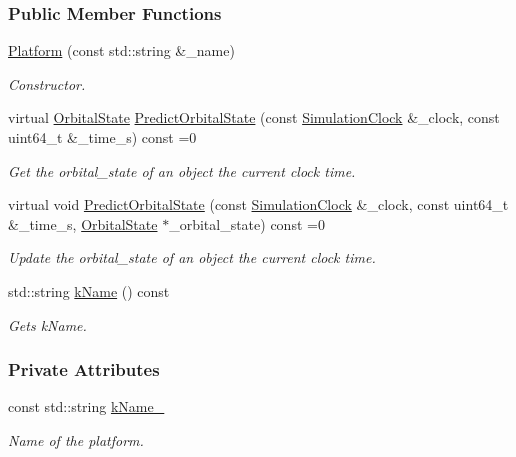 \subsubsection*{Public Member Functions}
\begin{DoxyCompactItemize}
\item 
\hyperlink{classosse_1_1collaborate_1_1_platform_aca95bfbb4f84285f1767d575a3e4c2ec}{Platform} (const std\+::string \&\+\_\+name)
\begin{DoxyCompactList}\small\item\em Constructor. \end{DoxyCompactList}\item 
virtual \hyperlink{classosse_1_1collaborate_1_1_orbital_state}{Orbital\+State} \hyperlink{classosse_1_1collaborate_1_1_platform_ad7070fcb9d91b22f25dbe0211ba0cc73}{Predict\+Orbital\+State} (const \hyperlink{classosse_1_1collaborate_1_1_simulation_clock}{Simulation\+Clock} \&\+\_\+clock, const uint64\+\_\+t \&\+\_\+time\+\_\+s) const =0
\begin{DoxyCompactList}\small\item\em Get the orbital\+\_\+state of an object the current clock time. \end{DoxyCompactList}\item 
virtual void \hyperlink{classosse_1_1collaborate_1_1_platform_a15881a343059315acdaf018e0c2470d8}{Predict\+Orbital\+State} (const \hyperlink{classosse_1_1collaborate_1_1_simulation_clock}{Simulation\+Clock} \&\+\_\+clock, const uint64\+\_\+t \&\+\_\+time\+\_\+s, \hyperlink{classosse_1_1collaborate_1_1_orbital_state}{Orbital\+State} $\ast$\+\_\+orbital\+\_\+state) const =0
\begin{DoxyCompactList}\small\item\em Update the orbital\+\_\+state of an object the current clock time. \end{DoxyCompactList}\item 
std\+::string \hyperlink{classosse_1_1collaborate_1_1_platform_a87b0b2589a6246dfd90ba3168ebf285c}{k\+Name} () const
\begin{DoxyCompactList}\small\item\em Gets k\+Name. \end{DoxyCompactList}\end{DoxyCompactItemize}
\subsubsection*{Private Attributes}
\begin{DoxyCompactItemize}
\item 
\mbox{\label{classosse_1_1collaborate_1_1_platform_a00a6267a955519320627877310f90b97}} 
const std\+::string \hyperlink{classosse_1_1collaborate_1_1_platform_a00a6267a955519320627877310f90b97}{k\+Name\+\_\+}
\begin{DoxyCompactList}\small\item\em Name of the platform. \end{DoxyCompactList}\end{DoxyCompactItemize}


